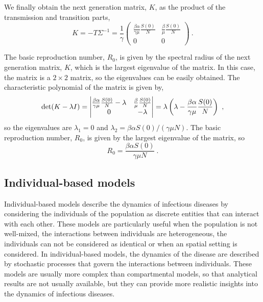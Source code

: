 We finally obtain the next generation matrix, $K$, as the product of the
transmission and transition parts,
\begin{equation}
  K=-T\Sigma^{-1}=\frac{1}{\gamma}\begin{pmatrix}
    \frac{\beta\alpha}{\gamma\mu}\frac{S(0)}{N} &
    \frac{\beta}{\mu}\frac{S(0)}{N}                 \\
    0                                           & 0
  \end{pmatrix} \ .
\end{equation}

The basic reproduction number, $R_0$, is given by the spectral radius of the
next generation matrix, $K$, which is the largest eigenvalue of the matrix. In
this case, the matrix is a $2\times2$ matrix, so the eigenvalues can be easily
obtained. The characteristic polynomial of the matrix is given by,
\begin{equation}
  \det(K-\lambda I)=\begin{vmatrix}
    \frac{\beta\alpha}{\gamma\mu}\frac{S(0)}{N}-\lambda &
    \frac{\beta}{\mu}\frac{S(0)}{N}                                \\
    0                                                   & -\lambda

  \end{vmatrix}=\lambda\left(\lambda-\frac{\beta\alpha}{\gamma\mu}
    \frac{S(0)}{N}\right)
  \ ,
\end{equation}
so the eigenvalues are $\lambda_1=0$ and $\lambda_2=\beta\alpha S(0)/(\gamma\mu
  N)$. The basic reproduction number, $R_0$, is given by the largest eigenvalue
of the matrix, so
\begin{equation}
  R_0=\frac{\beta\alpha S(0)}{\gamma\mu N} \ .
\end{equation}

\subsection{\label{sec:Individual-based models} Individual-based models}

Individual-based models describe the dynamics of infectious diseases by
considering the individuals of the population as discrete entities that can
interact with each other. These models are particularly useful when the
population is not well-mixed, the interactions between individuals are
heterogeneous, the individuals can not be considered as identical or when an
spatial setting is considered. In individual-based models, the dynamics of the
disease are described by stochastic processes that govern the interactions
between individuals. These models are usually more complex than compartmental
models, so that analytical results are not usually available, but they can
provide more realistic insights into the dynamics of infectious diseases.

